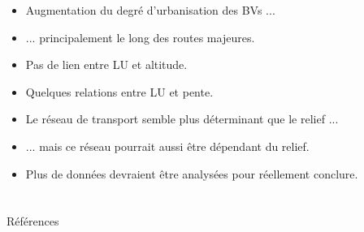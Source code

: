 \documentclass[aspectratio=169]{beamer}
\begin{document}
\begin{frame}
 	\begin{itemize}
 	\setlength{\itemsep}{10pt}
	\item Augmentation du degré d\rq{}urbanisation des BVs ...
	\item ... principalement le long des routes majeures.
	\item Pas de lien entre LU et altitude.
	\item Quelques relations entre LU et pente.
	\item Le réseau de transport semble plus déterminant que le relief ...
	\item ... mais ce réseau pourrait aussi être dépendant du relief.
	\item Plus de données devraient être analysées pour réellement conclure.
	\end{itemize}
\end{frame}

\section*{}

\begin{frame}[plain]{Références}
\printbibliography
\end{frame}

{
\begin{frame}[plain]
\end{frame}
}
\end{document}
